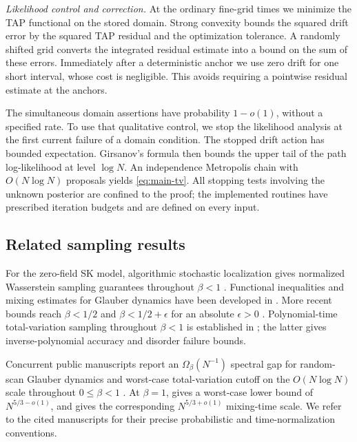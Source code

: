 \documentclass[11pt,reqno]{amsart}
\begin{document}
\emph{Likelihood control and correction.}
At the ordinary fine-grid times we minimize the TAP functional on the stored domain. Strong convexity bounds the squared drift error by the squared TAP residual and the optimization tolerance. A randomly shifted grid converts the integrated residual estimate into a bound on the sum of these errors. Immediately after a deterministic anchor we use zero drift for one short interval, whose cost is negligible. This avoids requiring a pointwise residual estimate at the anchors.

The simultaneous domain assertions have probability $1-o(1)$, without a specified rate. To use that qualitative control, we stop the likelihood analysis at the first current failure of a domain condition. The stopped drift action has bounded expectation. Girsanov's formula then bounds the upper tail of the path log-likelihood at level $\log N$. An independence Metropolis chain with $O(N\log N)$ proposals yields \eqref{eq:main-tv}. All stopping tests involving the unknown posterior are confined to the proof; the implemented routines have prescribed iteration budgets and are defined on every input.

\subsection{Related sampling results}\label{sec:related}

For the zero-field SK model, algorithmic stochastic localization gives normalized Wasserstein sampling guarantees throughout $\beta<1$ \cite{el2022sampling,celentano2024sudakov}. Functional inequalities and mixing estimates for Glauber dynamics have been developed in \cite{bauerschmidt2019very,eldan2022spectral,anari2024trickle,anari2022entropic,adhikari2024spectral,anari2024universality}. More recent bounds reach $\beta<1/2$ \cite{wang2026optimal} and $\beta<1/2+\epsilon$ for an absolute $\epsilon>0$ \cite[Corollary~1.6]{boban2026rank}. Polynomial-time total-variation sampling throughout $\beta<1$ is established in \cite{lee2026potential,hou2026simulated}; the latter gives inverse-polynomial accuracy and disorder failure bounds.

Concurrent public manuscripts report an $\Omega_\beta(N^{-1})$ spectral gap for random-scan Glauber dynamics \cite{openai2026d} and worst-case total-variation cutoff on the $O(N\log N)$ scale throughout $0\le\beta<1$ \cite{openai2026c}. At $\beta=1$, \cite{openai2026b} gives a worst-case lower bound of $N^{5/3-o(1)}$, and \cite{openai2026a} gives the corresponding $N^{5/3+o(1)}$ mixing-time scale. We refer to the cited manuscripts for their precise probabilistic and time-normalization conventions.
\end{document}
